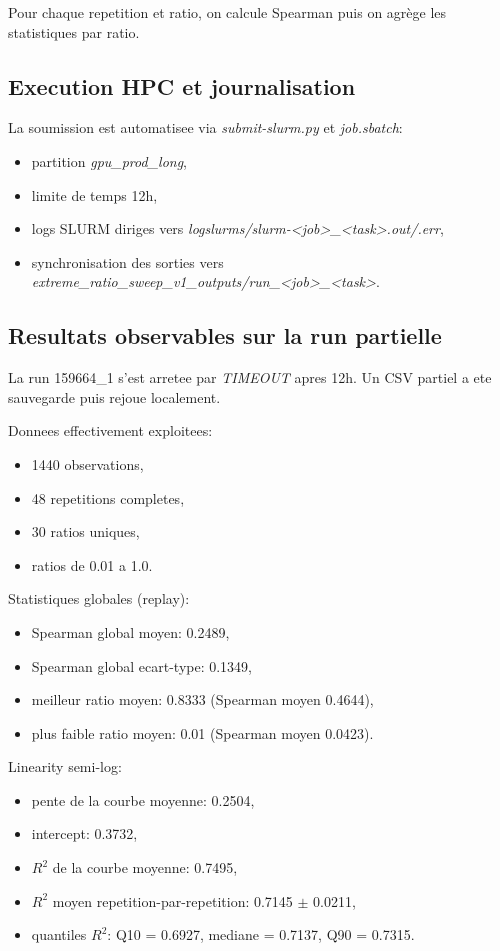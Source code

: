 \documentclass[11pt,a4paper]{article}
\begin{document}
Pour chaque repetition et ratio, on calcule Spearman puis on agrège les statistiques par ratio.

\subsection{Execution HPC et journalisation}
La soumission est automatisee via \textit{submit-slurm.py} et \textit{job.sbatch}:
\begin{itemize}[leftmargin=1.2cm]
    \item partition \textit{gpu\_prod\_long},
    \item limite de temps 12h,
    \item logs SLURM diriges vers \textit{logslurms/slurm-<job>\_<task>.out/.err},
    \item synchronisation des sorties vers \textit{extreme\_ratio\_sweep\_v1\_outputs/run\_<job>\_<task>}.
\end{itemize}

\subsection{Resultats observables sur la run partielle}
La run 159664\_1 s'est arretee par \textit{TIMEOUT} apres 12h. Un CSV partiel a ete sauvegarde puis rejoue localement.

Donnees effectivement exploitees:
\begin{itemize}[leftmargin=1.2cm]
    \item 1440 observations,
    \item 48 repetitions completes,
    \item 30 ratios uniques,
    \item ratios de 0.01 a 1.0.
\end{itemize}

Statistiques globales (replay):
\begin{itemize}[leftmargin=1.2cm]
    \item Spearman global moyen: 0.2489,
    \item Spearman global ecart-type: 0.1349,
    \item meilleur ratio moyen: 0.8333 (Spearman moyen 0.4644),
    \item plus faible ratio moyen: 0.01 (Spearman moyen 0.0423).
\end{itemize}

Linearity semi-log:
\begin{itemize}[leftmargin=1.2cm]
    \item pente de la courbe moyenne: 0.2504,
    \item intercept: 0.3732,
    \item $R^2$ de la courbe moyenne: 0.7495,
    \item $R^2$ moyen repetition-par-repetition: 0.7145 $\pm$ 0.0211,
    \item quantiles $R^2$: Q10 = 0.6927, mediane = 0.7137, Q90 = 0.7315.
\end{itemize}
\end{document}
